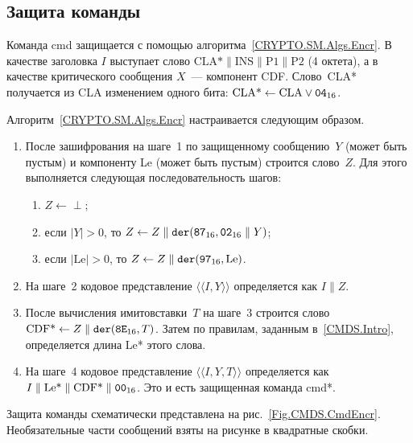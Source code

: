 \subsection{Защита команды}\label{CMDS.SM.EncrCmd}

Команда cmd защищается с помощью алгоритма~\ref{CRYPTO.SM.Algs.Encr}. 
%
В качестве заголовка $I$ выступает слово 
$\text{CLA*} \parallel \text{INS} \parallel \text{P1} \parallel \text{P2}$ 
(4 октета), а в качестве критического сообщения $X$~--- компонент CDF. 
%
Слово~CLA* получается из CLA изменением одного бита:
$\text{CLA*}\leftarrow\text{CLA}\vee\texttt{04}_{16}$.

Алгоритм~\ref{CRYPTO.SM.Algs.Encr} настраивается следующим образом.
\begin{enumerate}
\item
После зашифрования на шаге~1 по защищенному сообщению~$Y$
(может быть пустым) и компоненту Le (может быть пустым)
строится слово~$Z$. Для этого выполняется следующая 
последовательность шагов:
\begin{enumerate}
\item
$Z \gets\perp$;
\item
если $|Y|>0$, то $Z\gets Z\parallel\texttt{der}(\texttt{87}_{16},\texttt{02}_{16}\parallel Y)$;
\item
если $|\text{Le}|>0$, то $Z\gets Z\parallel\texttt{der}(\texttt{97}_{16}, \text{Le})$.
\end{enumerate}
\item
На шаге~2 кодовое представление $\langle\langle I,Y\rangle\rangle$
определяется как $I\parallel Z$.
\item
После вычисления имитовставки~$T$ на шаге~3 строится слово
$\text{CDF*}\gets Z\parallel \texttt{der}(\texttt{8E}_{16}, T)$.
Затем по правилам, заданным в~\ref{CMDS.Intro}, определяется длина Le* этого 
слова.
\item
На шаге~4 кодовое представление $\langle\langle I,Y,T\rangle\rangle$
определяется как $I\parallel\text{Le*}\parallel\text{CDF*}\parallel\texttt{00}_{16}$.
Это и есть защищенная команда cmd*.
\end{enumerate}

Защита команды схематически представлена на рис.~\ref{Fig.CMDS.CmdEncr}. 
Необязательные части сообщений взяты на рисунке в квадратные скобки.

